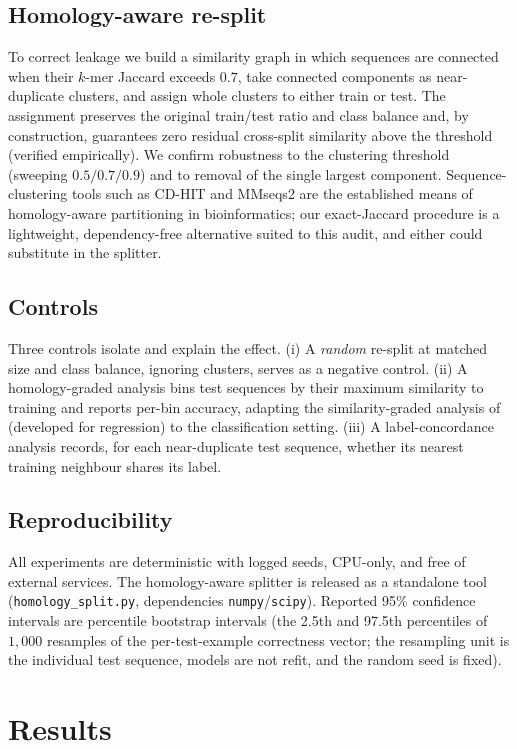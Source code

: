\documentclass[webpdf,modern,large,namedate]{oup-authoring-template}%
\begin{document}
\subsection{Homology-aware re-split}
To correct leakage we build a similarity graph in which sequences are connected when their $k$-mer Jaccard exceeds $0.7$, take connected components as near-duplicate clusters, and assign whole clusters to either train or test. The assignment preserves the original train/test ratio and class balance and, by construction, guarantees zero residual cross-split similarity above the threshold (verified empirically). We confirm robustness to the clustering threshold (sweeping $0.5/0.7/0.9$) and to removal of the single largest component. Sequence-clustering tools such as CD-HIT \citep{li2006cdhit} and MMseqs2 \citep{steinegger2017mmseqs2} are the established means of homology-aware partitioning in bioinformatics; our exact-Jaccard procedure is a lightweight, dependency-free alternative suited to this audit, and either could substitute in the splitter.

\subsection{Controls}
Three controls isolate and explain the effect. (i) A \emph{random} re-split at matched size and class balance, ignoring clusters, serves as a negative control. (ii) A homology-graded analysis bins test sequences by their maximum similarity to training and reports per-bin accuracy, adapting the similarity-graded analysis of \citet{rafi2025} (developed for regression) to the classification setting. (iii) A label-concordance analysis records, for each near-duplicate test sequence, whether its nearest training neighbour shares its label.

\subsection{Reproducibility}
All experiments are deterministic with logged seeds, CPU-only, and free of external services. The homology-aware splitter is released as a standalone tool (\texttt{homology\_split.py}, dependencies \texttt{numpy}/\texttt{scipy}). Reported 95\% confidence intervals are percentile bootstrap intervals (the 2.5th and 97.5th percentiles of $1{,}000$ resamples of the per-test-example correctness vector; the resampling unit is the individual test sequence, models are not refit, and the random seed is fixed).

\section{Results}
\end{document}
